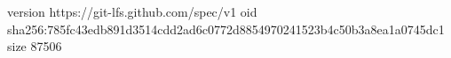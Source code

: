 version https://git-lfs.github.com/spec/v1
oid sha256:785fc43edb891d3514cdd2ad6c0772d8854970241523b4c50b3a8ea1a0745dc1
size 87506
